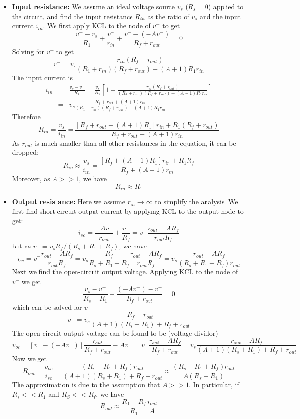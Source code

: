 \begin{itemize}
\begin{itemize}
    \item {\bf Input resistance:} We assume an ideal voltage source $v_s$ ($R_s=0$) 
      applied to the circuit, and find the input resistance $R_{in}$ as the ratio
      of $v_s$ and the input current $i_{in}$. We first apply KCL to the node of $v^-$ 
      to get
      \[ \frac{v^--v_s}{R_1}+\frac{v^-}{r_{in}}+\frac{v^--(-Av^-)}{R_f+r_{out}}=0 \]
      Solving for $v^-$ to get
      \[ v^-=v_s\frac{r_{in}(R_f+r_{out})}{(R_1+r_{in})(R_f+r_{out})+(A+1)R_1r_{in}} \]
      The input current is
      \begin{eqnarray}
	i_{in}&=&\frac{v_s-v^-}{R_1}=\frac{v_s}{R_1}\left[1-\frac{r_{in}(R_f+r_{out})}{(R_1+r_{in})(R_f+r_{out})+(A+1)R_1r_{in}}\right] 
	\nonumber \\
	&=&v_s\frac{R_f+r_{out}+(A+1)r_{in}}{(R_1+r_{in})(R_f+r_{out})+(A+1)R_1r_{in}} 
	\nonumber \end{eqnarray}
      Therefore
      \[ R_{in}=\frac{v_s}{i_{in}}=\frac{[R_f+r_{out}+(A+1)R_1]r_{in}+R_1(R_f+r_{out})}{R_f+r_{out}+(A+1)r_{in}} \]
      As $r_{out}$ is much smaller than all other resistances in the equation, it
      can be dropped:
      \[ R_{in}\approx \frac{v_s}{i_{in}}=\frac{[R_f+(A+1)R_1]r_{in}+R_1R_f}{R_f+(A+1)r_{in}} \]
      Moreover, as $A>>1$, we have
      \[ R_{in}\approx R_1 \]
    \item {\bf Output resistance:} Here we assume $r_{in}\rightarrow \infty$ to 
      simplify the analysis. We first find short-circuit output current by applying
      KCL to the output node to get:
      \[ i_{sc}=\frac{-A v^-}{r_{out}}+\frac{v^-}{R_f}
      =v^-\frac{r_{out}-AR_f}{r_{out}R_f}     \]
      but as $v^-=v_s R_f/(R_s+R_1+R_f)$, we have
      \[ i_{sc}=v^-\frac{r_{out}-AR_f}{r_{out}R_f}  
      =v_s\frac{R_f}{R_s+R_1+R_f} \frac{r_{out}-AR_f}{r_{out}R_f} 
      =v_s\frac{r_{out}-AR_f}{(R_s+R_1+R_f)r_{out}}  \]
      Next we find the open-circuit output voltage. Applying KCL to the node of $v^-$
      we get
      \[ \frac{v_s-v^-}{R_s+R_1}+\frac{(-Av^-)-v^-}{R_f+r_{out}}=0 \]
      which can be solved for $v^-$
      \[ v^-=v_s \frac{R_f+r_{out}}{(A+1)(R_s+R_1)+R_f+r_{out}} \]
      The open-circuit output voltage can be found to be (voltage dividor)
      \[ v_{oc}=[v^--(-Av^-)]\frac{r_{out}}{R_f+r_{out}}-Av^-=v^- \frac{r_{out}-AR_f}{R_f+r_{out}}
      =v_s \frac{r_{out}-AR_f}{(A+1)(R_s+R_1)+R_f+r_{out}} \]
      Now we get
      \[ R_{out}=\frac{v_{oc}}{i_{sc}}
      =\frac{(R_s+R_1+R_f)r_{out}}{(A+1)(R_s+R_1)+R_f+r_{out}}
      \approx \frac{(R_s+R_1+R_f)r_{out}}{A(R_s+R_1)} \]
      The approximation is due to the assumption that $A>>1$. In particular, 
      if $R_s<<R_1$ and $R_S<<R_f$, we have
      \[ R_{out}\approx \frac{R_1+R_f}{R_1} \frac{r_{out}}{A} \]
  \end{itemize}


\end{itemize}
